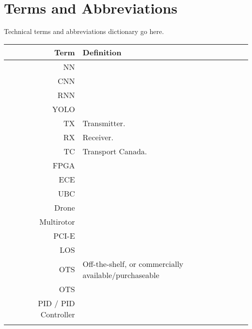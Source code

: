 \thispagestyle{empty}

\section*{Terms and Abbreviations}

Technical terms and abbreviations dictionary go here.

\begin{tabular}[h]{rl}
    \hline
    \textbf{Term} & \textbf{Definition}\\
    \hline

    NN &\\
    CNN &\\
    RNN &\\
    YOLO &\\
    TX & Transmitter.\\
    RX & Receiver.\\
    TC & Transport Canada.\\
    FPGA & \\
    ECE & \\
    UBC & \\
    Drone & \\
    Multirotor & \\
    PCI-E & \\
    LOS & \\
    OTS & Off-the-shelf, or commercially available/purchaseable \\
    OTS & \\
    PID / PID Controller & \\
     & \\

    \hline

\end{tabular}